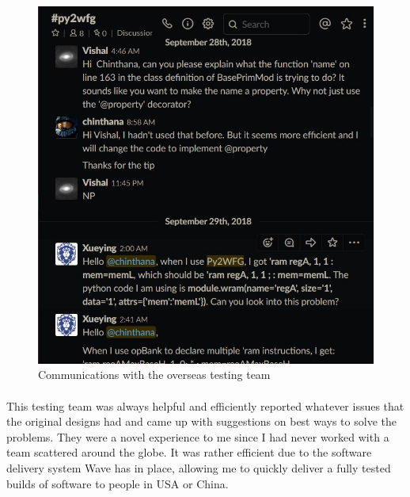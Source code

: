 \begin{figure}[h]
    \centering
    \includegraphics[trim=0cm 0cm 0cm 0cm, clip=true,scale=0.5]{figures/global_team.jpg}
    \caption{Communications with the overseas testing team\label{Fig:globalteam}}\vspace{-4mm}
    \end{figure}

\paragraph{}
This testing team was always helpful and efficiently reported whatever issues that the original designs had and came up with suggestions on best ways to solve the problems. They were a novel experience to me since I had never worked with a team scattered around the globe. It was rather efficient due to the software delivery system Wave has in place, allowing me to quickly deliver a fully tested builds of software to people in USA or China.